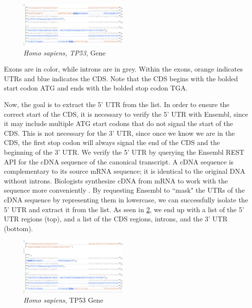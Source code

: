 \documentclass[letterpaper]{article}
\begin{document}
\begin{figure}[h!]
\centering
\vspace{-3mm}
\includegraphics[width=0.48\textwidth]{images/pre_processed_seq_homo_sapiens_tp53_ABBREV}
  \caption{\textit{Homo sapiens, TP53}, Gene}\label{fig:pre_processed_seq_homo_sapiens_tp53}
  \vspace{-3mm}
\end{figure}

Exons are in color, while introns are in grey. Within the exons, orange indicates UTRs and blue indicates the CDS. Note that the CDS begins with the bolded start codon ATG and ends with the bolded stop codon TGA.

Now, the goal is to extract the 5’ UTR from the list. In order to ensure the correct start of the CDS, it is necessary to verify the 5’ UTR with Ensembl, since it may include multiple ATG start codons that do not signal the start of the CDS. This is not necessary for the 3’ UTR, since once we know we are in the CDS, the first stop codon will always signal the end of the CDS and the beginning of the 3’ UTR. We verify the 5’ UTR by querying the Ensembl REST API for the cDNA sequence of the canonical transcript. A cDNA sequence is complementary to its source mRNA sequence; it is identical to the original DNA without introns. Biologists synthesize cDNA from mRNA to work with the sequence more conveniently \cite{ensembl_glossary}. By requesting Ensembl to ``mask" the UTRs of the cDNA sequence by representing them in lowercase, we can successfully isolate the 5’ UTR and extract it from the list. As seen in \ref{fig:post_processed_seq_homo_sapiens_tp53}, we end up with a list of the 5’ UTR regions (top), and a list of the CDS regions, introns, and the 3’ UTR (bottom).

\begin{figure}[h!]
\centering
\vspace{-3mm}
\includegraphics[width=0.48\textwidth]{images/post_processed_seq_homo_sapiens_tp53_ABBREV}
  \caption{\textit{Homo sapiens}, TP53 Gene}\label{fig:post_processed_seq_homo_sapiens_tp53}
  \vspace{-3mm}
\end{figure}
\end{document}
